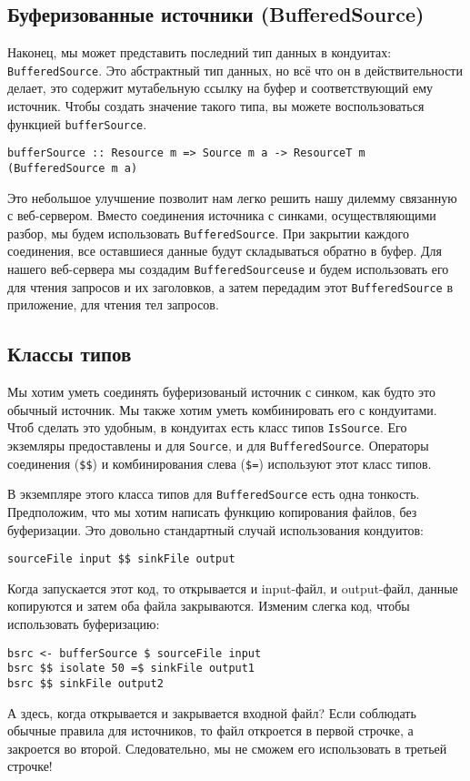 {\subsection{Буферизованные источники (BufferedSource)}
Наконец, мы может представить последний тип данных в кондуитах: 
\lstinline'BufferedSource'. Это абстрактный тип данных, но всё что он в 
действительности делает, это содержит мутабельную ссылку на буфер и 
соответствующий ему источник. Чтобы создать значение такого типа, вы можете 
воспользоваться функцией \lstinline'bufferSource'.
\begin{verbatim}
bufferSource :: Resource m => Source m a -> ResourceT m (BufferedSource m a)
\end{verbatim}
Это небольшое улучшение позволит нам легко решить нашу дилемму связанную с 
веб-сервером. Вместо соединения источника с синками, осуществляющими разбор, 
мы будем использовать \lstinline'BufferedSource'. При закрытии каждого 
соединения, все оставшиеся данные будут складываться обратно в буфер. 
Для нашего веб-сервера мы создадим \lstinline'BufferedSourceuse' и будем 
использовать его для чтения запросов и их заголовков, а затем передадим этот 
\lstinline'BufferedSource' в приложение, для чтения тел запросов.

\subsection{Классы типов}
Мы хотим уметь соединять буферизованый источник с синком, как будто это обычный источник.
Мы также хотим уметь комбинировать его с кондуитами. Чтоб сделать это удобным, в кондуитах
есть класс типов \lstinline'IsSource'. Его экземляры предоставлены и для
\lstinline'Source', и для \lstinline'BufferedSource'. 
Операторы соединения (\verb#$$#) и комбинирования слева (\verb#$=#) используют этот класс типов.

В экземпляре этого класса типов для \lstinline'BufferedSource' есть одна тонкость.
Предположим, что мы хотим написать функцию копирования файлов, без
буферизации. Это довольно стандартный случай использования кондуитов:
\begin{lstlisting}
sourceFile input $$ sinkFile output
\end{lstlisting}
Когда запускается этот код, то открывается и input-файл, и output-файл, данные 
копируются и затем оба файла закрываются. Изменим слегка код, чтобы 
использовать буферизацию:
\begin{lstlisting}
bsrc <- bufferSource $ sourceFile input
bsrc $$ isolate 50 =$ sinkFile output1
bsrc $$ sinkFile output2
\end{lstlisting}
А здесь, когда открывается и закрывается входной файл? Если соблюдать обычные 
правила для источников, то файл откроется в первой строчке, а закроется во 
второй. Следовательно, мы не сможем его использовать в третьей строчке!

}
